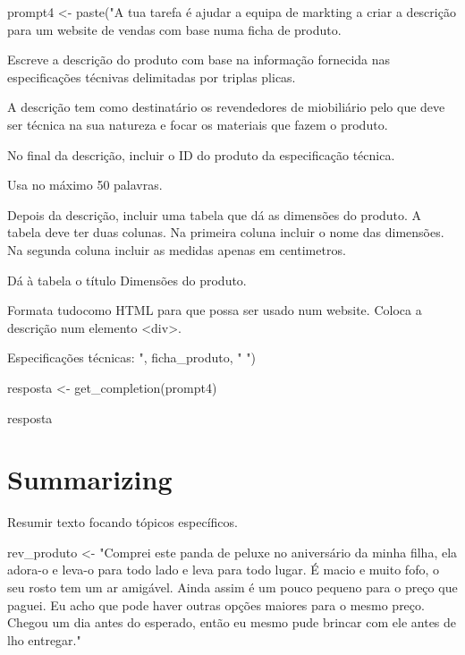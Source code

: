 \documentclass[
  letterpaper,
  paper=6in:9in,
  pagesize=pdftex,
  headinclude=on,
  footinclude=on,
  12pt]{scrbook}
\newenvironment{Shaded}{\begin{snugshade}}{\end{snugshade}}
\newcommand{\FunctionTok}[1]{\textcolor[rgb]{0.28,0.35,0.67}{#1}}
\newcommand{\NormalTok}[1]{\textcolor[rgb]{0.00,0.23,0.31}{#1}}
\newcommand{\OtherTok}[1]{\textcolor[rgb]{0.00,0.23,0.31}{#1}}
\newcommand{\StringTok}[1]{\textcolor[rgb]{0.13,0.47,0.30}{#1}}
\begin{document}
\begin{Shaded}
\begin{Highlighting}[]
\NormalTok{prompt4 }\OtherTok{\textless{}{-}} \FunctionTok{paste}\NormalTok{(}\StringTok{"A tua tarefa é ajudar a equipa de markting a criar a descrição }
\StringTok{para um website de vendas com base numa ficha de produto.}

\StringTok{Escreve a descrição do produto com base na informação fornecida }
\StringTok{nas especificações técnivas delimitadas por triplas plicas.}

\StringTok{A descrição tem como destinatário os revendedores de miobiliário pelo que deve ser técnica}
\StringTok{na sua natureza e focar os materiais que fazem o produto.}

\StringTok{No final da descrição, incluir o ID do produto da especificação técnica.}

\StringTok{Usa no máximo 50 palavras.}

\StringTok{Depois da descrição, incluir uma tabela que dá as dimensões do produto. }
\StringTok{A tabela deve ter duas colunas. Na primeira coluna incluir o nome das dimensões.}
\StringTok{Na segunda coluna incluir as medidas apenas em centimetros.}

\StringTok{Dá à tabela o título \textquotesingle{}Dimensões do produto\textquotesingle{}.}

\StringTok{Formata tudocomo HTML para que possa ser usado num website.}
\StringTok{Coloca a descrição num elemento \textless{}div\textgreater{}.}

\StringTok{Especificações técnicas: \textquotesingle{}\textquotesingle{}\textquotesingle{} "}\NormalTok{, ficha\_produto, }\StringTok{"\textquotesingle{}\textquotesingle{}\textquotesingle{} "}\NormalTok{)}

\NormalTok{resposta }\OtherTok{\textless{}{-}} \FunctionTok{get\_completion}\NormalTok{(prompt4)}

\NormalTok{resposta}
\end{Highlighting}
\end{Shaded}


\hypertarget{summarizing}{%
\chapter{Summarizing}\label{summarizing}}

Resumir texto focando tópicos específicos.

\begin{Shaded}
\begin{Highlighting}[]
\NormalTok{rev\_produto }\OtherTok{\textless{}{-}} \StringTok{"Comprei este panda de peluxe no aniversário da minha filha, }
\StringTok{ela adora{-}o e leva{-}o para todo lado e leva para todo lugar. }
\StringTok{É macio e muito fofo, o seu rosto tem um ar amigável. }
\StringTok{Ainda assim é um pouco pequeno para o preço que paguei. }
\StringTok{Eu acho que pode haver outras opções maiores para o mesmo preço. }
\StringTok{Chegou um dia antes do esperado, então eu mesmo pude brincar com ele antes de lho entregar."}
\end{Highlighting}
\end{Shaded}
\end{document}
